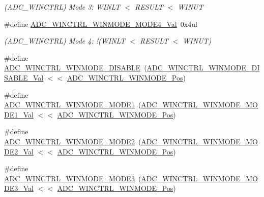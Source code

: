 \begin{DoxyCompactItemize}
\begin{DoxyCompactList}\small\item\em (A\+D\+C\+\_\+\+W\+I\+N\+C\+T\+RL) Mode 3\+: W\+I\+N\+LT $<$ R\+E\+S\+U\+LT $<$ W\+I\+N\+UT \end{DoxyCompactList}\item 
\#define \mbox{\hyperlink{group___s_a_m_d21___a_d_c_ga6e13dd056a0a8aa65b6e3aefad8f2c21}{A\+D\+C\+\_\+\+W\+I\+N\+C\+T\+R\+L\+\_\+\+W\+I\+N\+M\+O\+D\+E\+\_\+\+M\+O\+D\+E4\+\_\+\+Val}}~0x4ul
\begin{DoxyCompactList}\small\item\em (A\+D\+C\+\_\+\+W\+I\+N\+C\+T\+RL) Mode 4\+: !(W\+I\+N\+LT $<$ R\+E\+S\+U\+LT $<$ W\+I\+N\+UT) \end{DoxyCompactList}\item 
\#define \mbox{\hyperlink{group___s_a_m_d21___a_d_c_ga2972b42613490fa83a1fdcee828a6f33}{A\+D\+C\+\_\+\+W\+I\+N\+C\+T\+R\+L\+\_\+\+W\+I\+N\+M\+O\+D\+E\+\_\+\+D\+I\+S\+A\+B\+LE}}~(\mbox{\hyperlink{group___s_a_m_d21___a_d_c_gad426ea343c795919514df5154a43ad1c}{A\+D\+C\+\_\+\+W\+I\+N\+C\+T\+R\+L\+\_\+\+W\+I\+N\+M\+O\+D\+E\+\_\+\+D\+I\+S\+A\+B\+L\+E\+\_\+\+Val}} $<$$<$ \mbox{\hyperlink{group___s_a_m_d21___a_d_c_ga5c7a53123f9ec54b3295fc3850240fff}{A\+D\+C\+\_\+\+W\+I\+N\+C\+T\+R\+L\+\_\+\+W\+I\+N\+M\+O\+D\+E\+\_\+\+Pos}})
\item 
\#define \mbox{\hyperlink{group___s_a_m_d21___a_d_c_ga08ac658ef8738fa8bca43e9c50e2c684}{A\+D\+C\+\_\+\+W\+I\+N\+C\+T\+R\+L\+\_\+\+W\+I\+N\+M\+O\+D\+E\+\_\+\+M\+O\+D\+E1}}~(\mbox{\hyperlink{group___s_a_m_d21___a_d_c_ga3e70ea47133ebb9e04cfaf0b6a17a7ed}{A\+D\+C\+\_\+\+W\+I\+N\+C\+T\+R\+L\+\_\+\+W\+I\+N\+M\+O\+D\+E\+\_\+\+M\+O\+D\+E1\+\_\+\+Val}} $<$$<$ \mbox{\hyperlink{group___s_a_m_d21___a_d_c_ga5c7a53123f9ec54b3295fc3850240fff}{A\+D\+C\+\_\+\+W\+I\+N\+C\+T\+R\+L\+\_\+\+W\+I\+N\+M\+O\+D\+E\+\_\+\+Pos}})
\item 
\#define \mbox{\hyperlink{group___s_a_m_d21___a_d_c_ga4fac179ce7175238fe211e479dd2e9d3}{A\+D\+C\+\_\+\+W\+I\+N\+C\+T\+R\+L\+\_\+\+W\+I\+N\+M\+O\+D\+E\+\_\+\+M\+O\+D\+E2}}~(\mbox{\hyperlink{group___s_a_m_d21___a_d_c_gad026ac699f643c60645393016b3bf177}{A\+D\+C\+\_\+\+W\+I\+N\+C\+T\+R\+L\+\_\+\+W\+I\+N\+M\+O\+D\+E\+\_\+\+M\+O\+D\+E2\+\_\+\+Val}} $<$$<$ \mbox{\hyperlink{group___s_a_m_d21___a_d_c_ga5c7a53123f9ec54b3295fc3850240fff}{A\+D\+C\+\_\+\+W\+I\+N\+C\+T\+R\+L\+\_\+\+W\+I\+N\+M\+O\+D\+E\+\_\+\+Pos}})
\item 
\#define \mbox{\hyperlink{group___s_a_m_d21___a_d_c_ga79a8f1a07ec39edf4945226255ce71f3}{A\+D\+C\+\_\+\+W\+I\+N\+C\+T\+R\+L\+\_\+\+W\+I\+N\+M\+O\+D\+E\+\_\+\+M\+O\+D\+E3}}~(\mbox{\hyperlink{group___s_a_m_d21___a_d_c_ga607c7268facab50bcf70220e783fdd48}{A\+D\+C\+\_\+\+W\+I\+N\+C\+T\+R\+L\+\_\+\+W\+I\+N\+M\+O\+D\+E\+\_\+\+M\+O\+D\+E3\+\_\+\+Val}} $<$$<$ \mbox{\hyperlink{group___s_a_m_d21___a_d_c_ga5c7a53123f9ec54b3295fc3850240fff}{A\+D\+C\+\_\+\+W\+I\+N\+C\+T\+R\+L\+\_\+\+W\+I\+N\+M\+O\+D\+E\+\_\+\+Pos}})

\end{DoxyCompactItemize}
